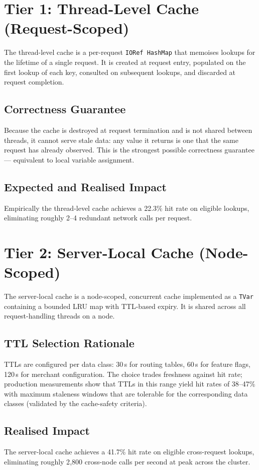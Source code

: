 \section{Tier 1: Thread-Level Cache (Request-Scoped)}
The thread-level cache is a per-request \texttt{IORef HashMap} that memoises lookups for the lifetime of a single request. It is created at request entry, populated on the first lookup of each key, consulted on subsequent lookups, and discarded at request completion.

\subsection{Correctness Guarantee}
Because the cache is destroyed at request termination and is not shared between threads, it cannot serve stale data: any value it returns is one that the same request has already observed. This is the strongest possible correctness guarantee --- equivalent to local variable assignment.

\subsection{Expected and Realised Impact}
Empirically the thread-level cache achieves a 22.3\% hit rate on eligible lookups, eliminating roughly 2--4 redundant network calls per request.

\section{Tier 2: Server-Local Cache (Node-Scoped)}
The server-local cache is a node-scoped, concurrent cache implemented as a \texttt{TVar} containing a bounded LRU map with TTL-based expiry. It is shared across all request-handling threads on a node.

\subsection{TTL Selection Rationale}
TTLs are configured per data class: 30\,s for routing tables, 60\,s for feature flags, 120\,s for merchant configuration. The choice trades freshness against hit rate; production measurements show that TTLs in this range yield hit rates of 38--47\% with maximum staleness windows that are tolerable for the corresponding data classes (validated by the cache-safety criteria).

\subsection{Realised Impact}
The server-local cache achieves a 41.7\% hit rate on eligible cross-request lookups, eliminating roughly 2{,}800 cross-node calls per second at peak across the cluster.

